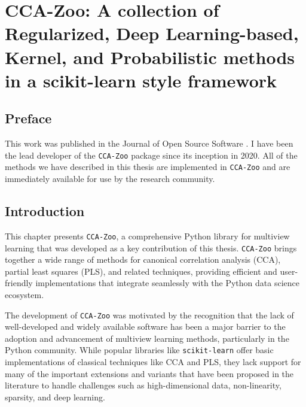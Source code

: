 \graphicspath{{chapters/software/}}


\chapter{CCA-Zoo: A collection of Regularized, Deep Learning-based, Kernel, and Probabilistic methods in a scikit-learn style framework}\label{ch:software}

\section*{Preface}

This work was published in the Journal of Open Source Software \citep{chapman2021cca}.
I have been the lead developer of the \texttt{CCA-Zoo} package since its inception in 2020.
All of the methods we have described in this thesis are implemented in \texttt{CCA-Zoo} and are immediately available for use by the research community.

\section{Introduction}

This chapter presents \texttt{CCA-Zoo}, a comprehensive Python library for multiview learning that was developed as a key contribution of this thesis. \texttt{CCA-Zoo} brings together a wide range of methods for canonical correlation analysis (CCA), partial least squares (PLS), and related techniques, providing efficient and user-friendly implementations that integrate seamlessly with the Python data science ecosystem.

The development of \texttt{CCA-Zoo} was motivated by the recognition that the lack of well-developed and widely available software has been a major barrier to the adoption and advancement of multiview learning methods, particularly in the Python community. While popular libraries like \texttt{scikit-learn} \citep{pedregosa2011scikit} offer basic implementations of classical techniques like CCA and PLS, they lack support for many of the important extensions and variants that have been proposed in the literature to handle challenges such as high-dimensional data, non-linearity, sparsity, and deep learning.

